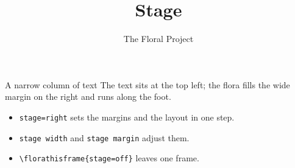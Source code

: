 \documentclass[aspectratio=169]{beamer}
\title{Stage}\author{The Floral Project}\date{}
\begin{document}
\begin{frame}{A narrow column of text}
  The text sits at the top left; the flora fills the wide margin on the
  right and runs along the foot.
  \begin{itemize}
    \item \texttt{stage=right} sets the margins and the layout in one step.
    \item \texttt{stage width} and \texttt{stage margin} adjust them.
    \item \texttt{\textbackslash florathisframe\{stage=off\}} leaves one frame.
  \end{itemize}
\end{frame}
\end{document}
